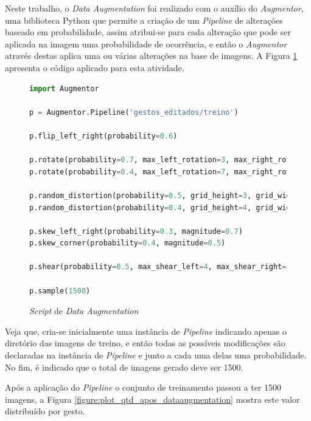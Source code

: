 \par Neste trabalho, o \textit{Data Augmentation} foi realizado com o auxílio do \textit{Augmentor}, uma biblioteca Python que permite a criação de um \textit{Pipeline} de alterações baseado em probabilidade, assim atribui-se para cada alteração que pode ser aplicada na imagem uma probabilidade de ocorrência, e então o \textit{Augmentor} através destas aplica uma ou várias alterações na base de imagens. A Figura \ref{figure:dataaugmentation} apresenta o código aplicado para esta atividade.

\begin{figure}[H]
    \centering
    \begin{lstlisting}[language=Python]
import Augmentor

p = Augmentor.Pipeline('gestos_editados/treino')

p.flip_left_right(probability=0.6)

p.rotate(probability=0.7, max_left_rotation=3, max_right_rotation=3)
p.rotate(probability=0.4, max_left_rotation=7, max_right_rotation=7)

p.random_distortion(probability=0.5, grid_height=3, grid_width=3, magnitude=2)
p.random_distortion(probability=0.4, grid_height=4, grid_width=4, magnitude=3)

p.skew_left_right(probability=0.3, magnitude=0.7)
p.skew_corner(probability=0.4, magnitude=0.5)

p.shear(probability=0.5, max_shear_left=4, max_shear_right=3)

p.sample(1500)
    \end{lstlisting}
    \caption{\textit{Script} de \textit{Data Augmentation}}
    \label{figure:dataaugmentation}
\end{figure}

\par Veja que, cria-se inicialmente uma instância de \textit{Pipeline} indicando apenas o diretório das imagens de treino, e então todas as possíveis modificações são declaradas na instância de \textit{Pipeline} e junto a cada uma delas uma probabilidade. No fim, é indicado que o total de imagens gerado deve ser 1500.


\par Após a aplicação do \textit{Pipeline} o conjunto de treinamento passou a ter 1500 imagens, a Figura \ref{figure:plot_qtd_apos_dataaugmentation} mostra este valor distribuído por gesto.


